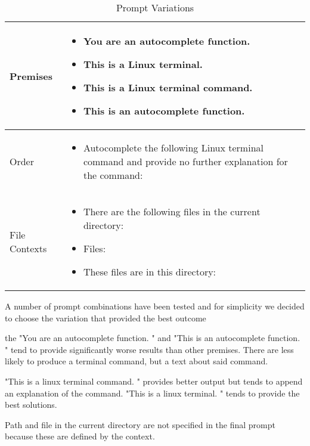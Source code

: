 \begin{table}[htbp]
    \centering
    \caption{Prompt Variations}
    \begin{tabular}{|p{5cm}|p{8cm}|}
        \hline
        Premises & 
        \begin{itemize}
            \item You are an autocomplete function.
            \item This is a Linux terminal.
            \item This is a Linux terminal command.
            \item This is an autocomplete function.
        \end{itemize}
        \\
        \hline
        Order & 
        \begin{itemize}
            \item Autocomplete the following Linux terminal command and provide no further explanation for the command:
        \end{itemize}
        \\
        \hline
        File Contexts & 
        \begin{itemize}
            \item There are the following files in the current directory:
            \item Files:
            \item These files are in this directory:
        \end{itemize}
        \\
        \hline
    \end{tabular}
\end{table}


 

A number of prompt combinations have been tested and for simplicity we decided to choose the variation that provided the best outcome 


the "You are an autocomplete function. " and "This is an autocomplete function. " tend to provide significantly worse results than other premises. There are less likely to produce a terminal command, but a text about said command.

"This is a linux terminal command. " provides better output but tends to append an explanation of the command. "This is a linux terminal. " tends to provide the best solutions. 



Path and file in the current directory are not specified in the final prompt because these are defined by the context.


